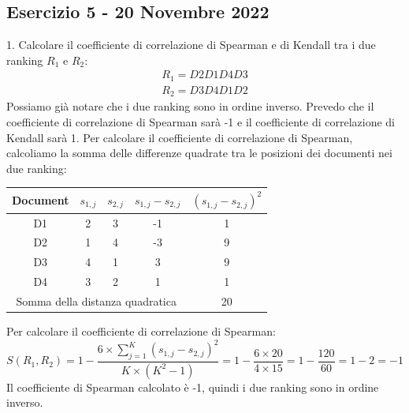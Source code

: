 \documentclass{report}
\begin{document}
	\subsection*{Esercizio 5 - 20 Novembre 2022}
	1. Calcolare il coefficiente di correlazione di Spearman e di Kendall tra i due ranking $R_{1}$ e $R_{2}$:
	\[
		\begin{array}{l}
			R_{1} = D2 D1 D4 D3\\
			R_{2} = D3 D4 D1 D2
		\end{array}
	\]
	Possiamo già notare che i due ranking sono in ordine inverso. Prevedo che il coefficiente di correlazione di Spearman sarà -1 e il coefficiente di correlazione di Kendall sarà 1.
	Per calcolare il coefficiente di correlazione di Spearman, calcoliamo la somma delle differenze quadrate tra le posizioni dei documenti nei due ranking:
	\begin{table}[H]
		\centering
		\begin{tabular}{|c|c|c|c|c|}
			\hline
			\textbf{Document} & \textbf{$s_{1,j}$} & \textbf{$s_{2,j}$} & \textbf{$s_{1,j} - s_{2,j}$} & \textbf{$(s_{1,j} - s_{2,j})^2$}\\ 
			\hline
			D1 & 2 & 3 & -1 & 1\\
			D2 & 1 & 4 & -3 & 9\\
			D3 & 4 & 1 & 3 & 9\\
			D4 & 3 & 2 & 1 & 1\\
			\hline
			\multicolumn{4}{|c|}{Somma della distanza quadratica} & 20\\
			\hline
		\end{tabular}
	\end{table}
	Per calcolare il coefficiente di correlazione di Spearman:
	\[
		S(R_1, R_2) = 1 - \frac{6 \times \sum_{j=1}^{K} (s_{1,j} - s_{2,j})^2}{K \times (K^2 - 1)} = 1 - \frac{6 \times 20}{4 \times 15} = 1 - \frac{120}{60} = 1 - 2 = -1
	\]
	Il coefficiente di Spearman calcolato è -1, quindi i due ranking sono in ordine inverso.
\end{document}
